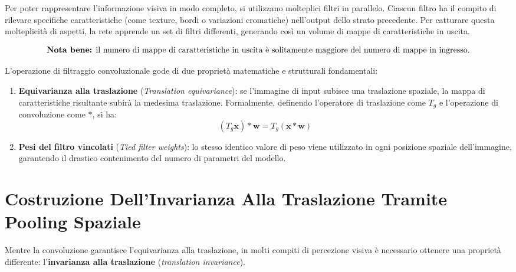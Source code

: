 ﻿\documentclass[11pt, a4paper]{article}
\begin{document}
Per poter rappresentare l'informazione visiva in modo completo, si utilizzano molteplici filtri in parallelo. Ciascun filtro ha il compito di rilevare specifiche caratteristiche (come texture, bordi o variazioni cromatiche) nell'output dello strato precedente. Per catturare questa molteplicità di aspetti, la rete apprende un set di filtri differenti, generando così un volume di mappe di caratteristiche in uscita.

\[
\text{\textbf{Nota bene:} il numero di mappe di caratteristiche in uscita è solitamente maggiore del numero di mappe in ingresso.}
\]


L'operazione di filtraggio convoluzionale gode di due proprietà matematiche e strutturali fondamentali:
\begin{enumerate}
    \item \textbf{Equivarianza alla traslazione} (\emph{Translation equivariance}): se l'immagine di input subisce una traslazione spaziale, la mappa di caratteristiche risultante subirà la medesima traslazione. Formalmente, definendo l'operatore di traslazione come $T_g$ e l'operazione di convoluzione come $\ast$, si ha:
    \[
    (T_g \bm{x}) \ast \bm{w} = T_g (\bm{x} \ast \bm{w})
    \]
    \item \textbf{Pesi del filtro vincolati} (\emph{Tied filter weights}): lo stesso identico valore di peso viene utilizzato in ogni posizione spaziale dell'immagine, garantendo il drastico contenimento del numero di parametri del modello.
\end{enumerate}


\newpage

\section{Costruzione Dell'Invarianza Alla Traslazione Tramite Pooling Spaziale}

Mentre la convoluzione garantisce l'equivarianza alla traslazione, in molti compiti di percezione visiva è necessario ottenere una proprietà differente: l'\textbf{invarianza alla traslazione} (\emph{translation invariance}).
\end{document}
